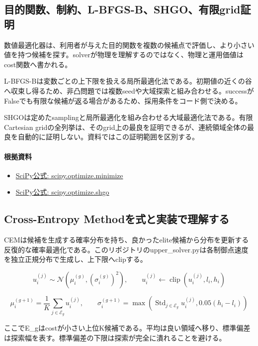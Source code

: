 \documentclass[a4paper,11pt]{article}
\begin{document}
\subsection{目的関数、制約、L-BFGS-B、SHGO、有限grid証明}
数値最適化器は、利用者が与えた目的関数を複数の候補点で評価し、より小さい値を持つ候補を探す。solverが物理を理解するのではなく、物理と運用価値はcost関数へ書かれる。


L-BFGS-Bは変数ごとの上下限を扱える局所最適化法である。初期値の近くの谷へ収束し得るため、非凸問題では複数seedや大域探索と組み合わせる。successがFalseでも有限な候補が返る場合があるため、採用条件をコード側で決める。


SHGOは定めたsamplingと局所最適化を組み合わせる大域最適化法である。有限Cartesian gridの全列挙は、そのgrid上の最良を証明できるが、連続領域全体の最良を自動的に証明しない。資料ではこの証明範囲を区別する。

\paragraph{根拠資料}
\begin{itemize}[leftmargin=1.6em]
\item \href{https://docs.scipy.org/doc/scipy/reference/generated/scipy.optimize.minimize.html}{SciPy公式: scipy.optimize.minimize}
\item \href{https://docs.scipy.org/doc/scipy/reference/generated/scipy.optimize.shgo.html}{SciPy公式: scipy.optimize.shgo}
\end{itemize}

\subsection{Cross-Entropy Methodを式と実装で理解する}
CEMは候補を生成する確率分布を持ち、良かったelite候補から分布を更新する反復的な確率最適化である。このリポジトリのupper\_solver.pyは各制御点速度を独立正規分布で生成し、上下限へclipする。


\[
u_i^{(j)} \sim \mathcal{N}(\mu_i^{(g)},(\sigma_i^{(g)})^2),\qquad u_i^{(j)}\leftarrow\operatorname{clip}(u_i^{(j)},l_i,h_i)
\]

\[
\mu_i^{(g+1)}=\frac{1}{K}\sum_{j\in\mathcal{E}_g}u_i^{(j)},\qquad \sigma_i^{(g+1)}=\max\left(\operatorname{Std}_{j\in\mathcal{E}_g}u_i^{(j)},0.05(h_i-l_i)\right)
\]

ここでE\_gはcostが小さい上位K候補である。平均は良い領域へ移り、標準偏差は探索幅を表す。標準偏差の下限は探索が完全に潰れることを避ける。
\end{document}
